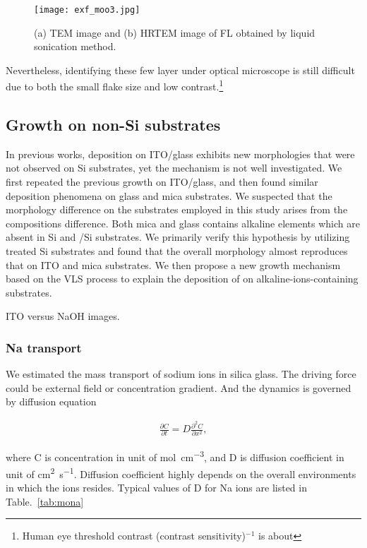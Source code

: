 \begin{figure}[htb]
\centering
\texttt{[image: exf\_moo3.jpg]}
\caption[TEM images of exfoliated ]{(a) TEM image and (b) HRTEM image of FL  obtained by liquid sonication method.}
\label{fig:motem}
\end{figure}

Nevertheless, identifying these few layer  under optical microscope is still difficult due to both the small flake size and low contrast.\footnote{Human eye threshold contrast (contrast sensitivity)$^{-1}$ is about}

\subsection{Growth on non-Si substrates}\label{sec:nasi}

In previous works,  deposition on ITO/glass exhibits new morphologies that were not observed on Si substrates, yet the mechanism is not well investigated.\cite{predeep2011} We first repeated the previous growth on ITO/glass, and then found similar deposition phenomena on glass and mica substrates. We suspected that the morphology difference on the substrates employed in this study arises from the compositions difference. Both mica and glass contains alkaline elements which are absent in Si and /Si substrates. We primarily verify this hypothesis by utilizing  treated Si substrates and found that the overall morphology almost reproduces that on ITO and mica substrates. We then propose a new growth mechanism based on the VLS process to explain the deposition of  on alkaline-ions-containing substrates.

ITO versus NaOH images.


\subsubsection{Na transport}
We estimated the mass transport of sodium ions in silica glass. The driving force could be external field or concentration gradient. And the dynamics is governed by diffusion equation

\begin{align}
\frac{\partial C}{\partial t} = D \frac{\partial^2 C}{\partial x^2},
\end{align}

where C is concentration in unit of \si{mol\per cm^3}, and D is diffusion coefficient in unit of \si{cm^2\per\second}. Diffusion coefficient highly depends on the overall environments in which the ions resides. Typical values of D for Na ions are listed in Table.~\ref{tab:mona}

